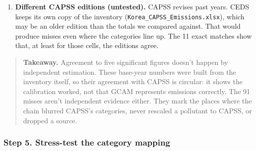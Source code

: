 \begin{enumerate}
  \begin{itemize}
  \tightlist
  \item
    Refinery fuel combustion appears to sit in GCAM's industrial energy use
    rather than with energy production (audit §B5.5, inferred).
  \item
    Several activities carry no tag at all (Step 3).
  \item
    Two categories are mostly missing:

    \begin{itemize}
    \tightlist
    \item
      \textbf{Energy transport and storage VOCs} are only 12--18\% of CAPSS.
      CAPSS's category covers fuel storage and distribution losses, but the
      GCAM rows we map there are resource-extraction fugitives and hydrogen
      delivery. We found no GCAM tag that covers fuel distribution.
    \item
      \textbf{Biomass-burning CO and VOCs} are only 6--11\% of CAPSS. In
      GCAM, this category holds only crop-residue burning and forest,
      grassland and deforestation fires; residential wood burning is mapped
      to Non-industry. The remainder of CAPSS's category is likely missing or
      sitting in another category.
    \end{itemize}
  \end{itemize}
\item
  \textbf{Different CAPSS editions (untested).} CAPSS revises past years. CEDS
  keeps its own copy of the inventory
  (\texttt{Korea\_CAPSS\_Emissions.xlsx}), which may be an older edition than
  the totals we compared against. That would produce misses even where the
  categories line up. The 11 exact matches show that, at least for those
  cells, the editions agree.
\end{enumerate}

\begin{quote}
\plainmark{}
\textbf{Takeaway.}
Agreement
to five
significant
figures
doesn't
happen by
independent
estimation.
These
base-year
numbers
were built
from the
inventory
itself, so
their
agreement
with CAPSS
is
circular:
it shows
the
calibration
worked,
not that
GCAM
represents
emissions
correctly. The 91
misses aren't independent evidence either. They mark the places where the
chain blurred CAPSS's categories, never rescaled a pollutant to CAPSS, or
dropped a source.
\end{quote}

\hypertarget{step-5.-stress-test-the-category-mapping}{%
\subsubsection*{Step 5. Stress-test the category mapping}\label{step-5.-stress-test-the-category-mapping}}


